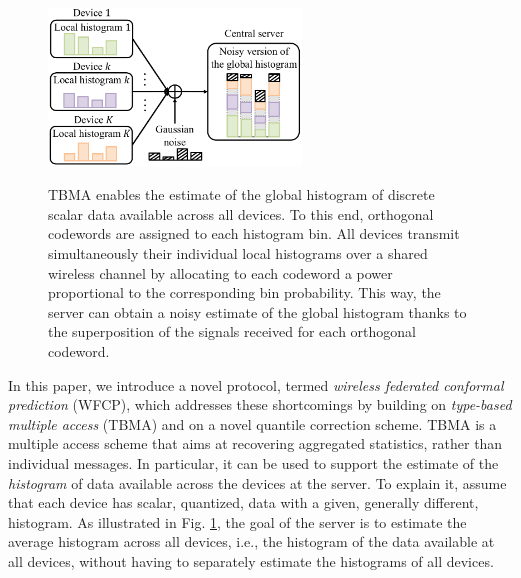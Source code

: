 \documentclass[12pt, draftclsnofoot, onecolumn]{IEEEtran}
\begin{document}

\begin{figure}[t]
    \centering
    {\includegraphics[width = 0.6\textwidth]{./figures/histogram_illus_noi.pdf}}
    \caption{TBMA enables the estimate of the global histogram of discrete scalar data available across all devices. To this end,  orthogonal codewords are assigned to each histogram bin. All devices transmit simultaneously  their individual local histograms over a shared wireless channel by allocating to each codeword a power proportional to the corresponding bin probability. This way, the server can obtain a noisy estimate of the global histogram thanks to the superposition of the signals received for each orthogonal codeword.}
    \label{histogram_illus}
\end{figure}

In this paper, we introduce a novel protocol, termed \emph{wireless federated conformal prediction} (WFCP), which addresses these shortcomings by building on \emph{type-based multiple access} (TBMA) \cite{Tong_TBMA, Liu_TBMA} and on a novel quantile correction scheme. TBMA is a multiple access scheme that aims at recovering aggregated statistics, rather than individual messages. In particular, it can be used to support the estimate of the \emph{histogram} of data available across the devices at the server. To explain it, assume that each device has scalar, quantized, data with a given, generally different,  histogram.  As illustrated in Fig. \ref{histogram_illus}, the goal of the server is to estimate the average histogram across all devices, i.e., the histogram of the data available at all devices, without having to separately estimate the histograms of all devices. 
\end{document}

